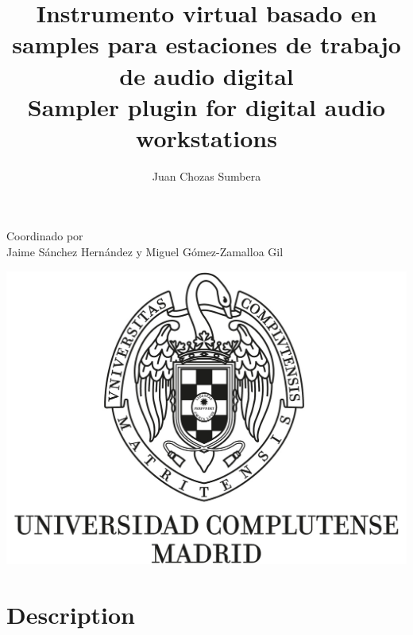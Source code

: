 \documentclass[12pt , a4paper]{article}
\title{Instrumento virtual basado en samples para estaciones de trabajo de audio digital\\Sampler plugin for digital audio workstations}
\author{Juan Chozas Sumbera}
\begin{document}
	\maketitle
	\begin{center}
		Coordinado por\\Jaime Sánchez Hernández y Miguel Gómez-Zamalloa Gil
		\newline
				
		\includegraphics[width=\textwidth]{logo_UCM.jpg}
	\end{center}

	
	
	\newpage
	\tableofcontents
	
	\newpage
	\section{Description}
\end{document}
